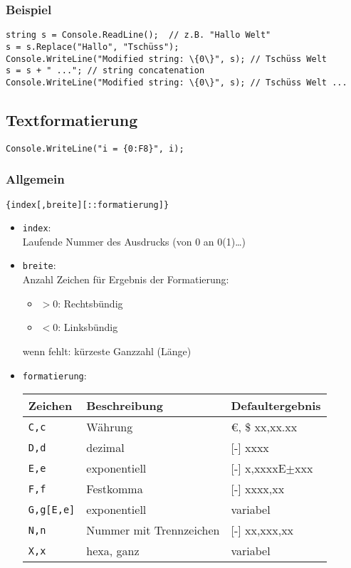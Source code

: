 \subsubsection*{Beispiel}
\begin{lstlisting}[language={[Sharp]C}]
string s = Console.ReadLine();	// z.B. "Hallo Welt"
s = s.Replace("Hallo", "Tschüss");
Console.WriteLine("Modified string: \{0\}", s);	// Tschüss Welt
s = s + " ...";	// string concatenation
Console.WriteLine("Modified string: \{0\}", s);	// Tschüss Welt ... 
\end{lstlisting}

\subsection{Textformatierung}
\lstinline$Console.WriteLine("i = {0:F8}", i);$
\subsubsection*{Allgemein}
\lstinline${index[,breite][::formatierung]}$
\begin{itemize}
\item \lstinline$index$:\\
Laufende Nummer des Ausdrucks (von 0 an 0(1)…)
\item \lstinline$breite$:\\
Anzahl Zeichen für Ergebnis der Formatierung:
\begin{itemize}
\item $>0$: Rechtsbündig
\item $<0$: Linksbündig
\end{itemize}
wenn fehlt: kürzeste Ganzzahl (Länge)
\item \lstinline$formatierung$:\\
\begin{tabular}{l l l}
Zeichen & Beschreibung & Defaultergebnis\\\hline
\lstinline$C,c$ & Währung & \euro{}, \$ xx,xx.xx\\
\lstinline$D,d$ & dezimal & [-] xxxx \\
\lstinline$E,e$ & exponentiell & [-] x,xxxxE$\pm$xxx \\
\lstinline$F,f$ & Festkomma & [-] xxxx,xx \\
\lstinline$G,g[E,e]$ & exponentiell & variabel \\
\lstinline$N,n$ & Nummer mit Trennzeichen & [-] xx,xxx,xx \\
\lstinline$X,x$ & hexa, ganz & variabel \\
\end{tabular}
\end{itemize}
